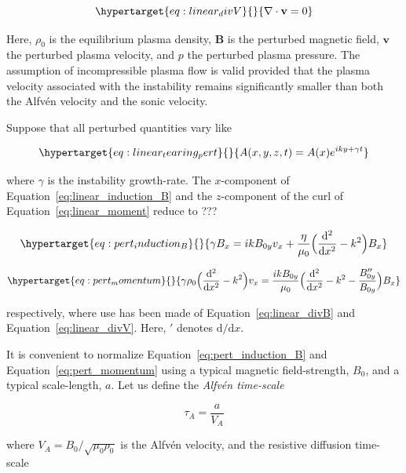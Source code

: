 \documentclass[
  notoc %
]{tufte-book}
\begin{document}
\begin{equation}\protect\hypertarget{eq:linear_divV}{}{
\nabla\cdot\mathbf{v}=0
}\label{eq:linear_divV}\end{equation}

Here, \(\rho_0\) is the equilibrium plasma density, \(\mathbf{B}\) is
the perturbed magnetic field, \(\mathbf{v}\) the perturbed plasma
velocity, and \(p\) the perturbed plasma pressure. The assumption of
incompressible plasma flow is valid provided that the plasma velocity
associated with the instability remains significantly smaller than both
the Alfvén velocity and the sonic velocity.

Suppose that all perturbed quantities vary like

\begin{equation}\protect\hypertarget{eq:linear_tearing_pert}{}{
A(x,y,z,t)=A(x)e^{iky+\gamma t}
}\label{eq:linear_tearing_pert}\end{equation}

where \(\gamma\) is the instability growth-rate. The \(x\)-component of
Equation~\ref{eq:linear_induction_B} and the \(z\)-component of the curl
of Equation~\ref{eq:linear_moment} reduce to ???

\begin{equation}\protect\hypertarget{eq:pert_induction_B}{}{
\gamma B_x = ikB_{0y}v_x + \frac{\eta}{\mu_0}\Big( \frac{\mathrm{d}^2}{\mathrm{d}x^2}-k^2\Big)B_x
}\label{eq:pert_induction_B}\end{equation}

\begin{equation}\protect\hypertarget{eq:pert_momentum}{}{
\gamma \rho_0 \Big( \frac{\mathrm{d}^2}{\mathrm{d}x^2}-k^2 \Big)v_x=\frac{ikB_{0y}}{\mu_0}\Big( \frac{\mathrm{d}^2}{\mathrm{d}x^2}-k^2-\frac{B_{0y}^{\prime\prime}}{B_{0y}}\Big)B_x
}\label{eq:pert_momentum}\end{equation}

respectively, where use has been made of Equation~\ref{eq:linear_divB}
and Equation~\ref{eq:linear_divV}. Here, \(\prime\) denotes
\(\mathrm{d}/\mathrm{d}x\).

It is convenient to normalize Equation~\ref{eq:pert_induction_B} and
Equation~\ref{eq:pert_momentum} using a typical magnetic field-strength,
\(B_0\), and a typical scale-length, \(a\). Let us define the
\emph{Alfvén time-scale}

\[
\tau_A=\frac{a}{V_A}
\]

where \(V_A=B_0/\sqrt{\mu_0 \rho_0}\) is the Alfvén velocity, and the
resistive diffusion time-scale
\end{document}
